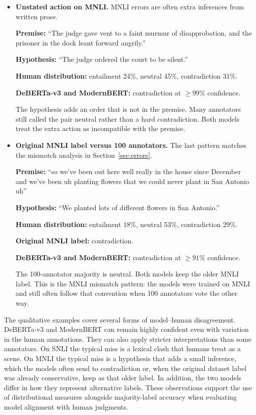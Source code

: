 \documentclass[11pt,a4paper]{article}
\begin{document}
\begin{itemize}[itemsep=0.5em, topsep=0.4em]
\item \textbf{Unstated action on MNLI.}
MNLI errors are often extra inferences from written prose.

\textbf{Premise:} ``The judge gave vent to a faint murmur of disapprobation, and the prisoner in the dock leant forward angrily.''

\textbf{Hypothesis:} ``The judge ordered the court to be silent.''

\textbf{Human distribution:} entailment 24\%, neutral 45\%, contradiction 31\%.

\textbf{DeBERTa-v3 and ModernBERT:} contradiction at $\geq 99\%$ confidence.

The hypothesis adds an order that is not in the premise. Many annotators still called the pair neutral rather than a hard contradiction. Both models treat the extra action as incompatible with the premise.

\item \textbf{Original MNLI label versus 100 annotators.}
The last pattern matches the mismatch analysis in Section~\ref{sec:errors}.

\textbf{Premise:} ``so we've been out here well really in the house since December and we've been uh planting flowers that we could never plant in San Antonio uh''

\textbf{Hypothesis:} ``We planted lots of different flowers in San Antonio.''

\textbf{Human distribution:} entailment 18\%, neutral 53\%, contradiction 29\%.

\textbf{Original MNLI label:} contradiction.

\textbf{DeBERTa-v3 and ModernBERT:} contradiction at $\geq 91\%$ confidence.

The 100-annotator majority is neutral. Both models keep the older MNLI label. This is the MNLI mismatch pattern: the models were trained on MNLI and still often follow that convention when 100 annotators vote the other way.

\end{itemize}

The qualitative examples cover several forms of model--human disagreement. DeBERTa-v3 and ModernBERT can remain highly confident even with variation in the human annotations. They can also apply stricter interpretations than some annotators. On SNLI the typical miss is a lexical clash that humans treat as a scene. On MNLI the typical miss is a hypothesis that adds a small inference, which the models often send to contradiction or, when the original dataset label was already conservative, keep as that older label. In addition, the two models differ in how they represent alternative labels. These observations support the use of distributional measures alongside majority-label accuracy when evaluating model alignment with human judgments.
\end{document}
